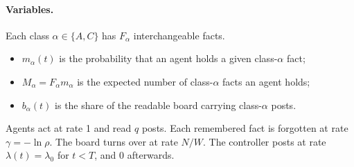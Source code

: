 \documentclass[10pt,a4paper]{article}
\begin{document}
\paragraph{Variables.} Each class $\alpha\in\{A,C\}$ has $F_\alpha$ interchangeable facts.
\begin{itemize}
\item $m_\alpha(t)$ is the probability that an agent holds a given class-$\alpha$ fact;
\item $M_\alpha=F_\alpha m_\alpha$ is the expected number of class-$\alpha$ facts an agent holds;
\item $b_\alpha(t)$ is the share of the readable board carrying class-$\alpha$ posts.
\end{itemize}
Agents act at rate 1 and read $q$ posts. Each remembered fact is forgotten at rate $\gamma=-\ln\rho$. The board turns
over at rate $N/W$. The controller posts at rate $\lambda(t)=\lambda_0$ for $t<T$, and 0 afterwards.
\end{document}
